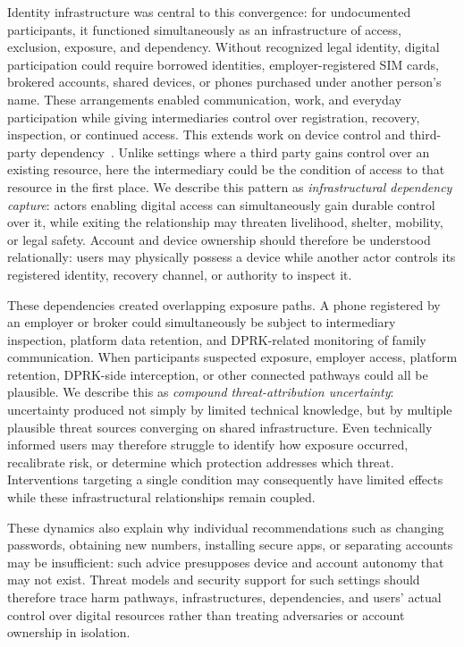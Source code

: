 \documentclass[conference,compsoc]{IEEEtran}
\begin{document}
Identity infrastructure was central to this convergence: for undocumented participants, it functioned simultaneously as an infrastructure of access, exclusion, exposure, and dependency. Without recognized legal identity, digital participation could require borrowed identities, employer-registered SIM cards, brokered accounts, shared devices, or phones purchased under another person's name. These arrangements enabled communication, work, and everyday participation while giving intermediaries control over registration, recovery, inspection, or continued access. This extends work on device control and third-party dependency~\cite{freed2017digital,matthews2017stories,tseng2022care,leitao2019anticipating}. Unlike settings where a third party gains control over an existing resource, here the intermediary could be the condition of access to that resource in the first place. We describe this pattern as \emph{infrastructural dependency capture}: actors enabling digital access can simultaneously gain durable control over it, while exiting the relationship may threaten livelihood, shelter, mobility, or legal safety. Account and device ownership should therefore be understood relationally: users may physically possess a device while another actor controls its registered identity, recovery channel, or authority to inspect it.

These dependencies created overlapping exposure paths. A phone registered by an employer or broker could simultaneously be subject to intermediary inspection, platform data retention, and DPRK-related monitoring of family communication. When participants suspected exposure, employer access, platform retention, DPRK-side interception, or other connected pathways could all be plausible. We describe this as \emph{compound threat-attribution uncertainty}: uncertainty produced not simply by limited technical knowledge, but by multiple plausible threat sources converging on shared infrastructure. Even technically informed users may therefore struggle to identify how exposure occurred, recalibrate risk, or determine which protection addresses which threat. Interventions targeting a single condition may consequently have limited effects while these infrastructural relationships remain coupled.

These dynamics also explain why individual recommendations such as changing passwords, obtaining new numbers, installing secure apps, or separating accounts may be insufficient: such advice presupposes device and account autonomy that may not exist. Threat models and security support for such settings should therefore trace harm pathways, infrastructures, dependencies, and users' actual control over digital resources rather than treating adversaries or account ownership in isolation.
\end{document}

